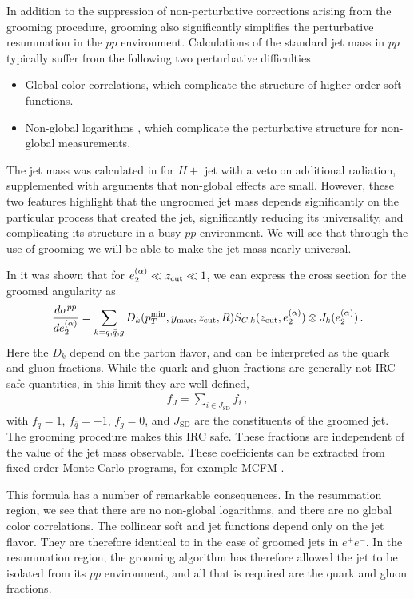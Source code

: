 In addition to the suppression of non-perturbative corrections arising from the grooming procedure, grooming also significantly simplifies the perturbative resummation in the $pp$ environment. Calculations of the standard jet mass in $pp$ typically suffer from the following two perturbative difficulties
\begin{itemize}
\item Global color correlations, which complicate the structure of higher order soft functions.
\item Non-global logarithms \cite{Dasgupta:2001sh}, which complicate the perturbative structure for non-global measurements.
\end{itemize}
The jet mass was calculated in \cite{Jouttenus:2013hs} for $H+$ jet with a veto on additional radiation, supplemented with arguments that non-global effects are small. However, these two features highlight that the ungroomed jet mass depends significantly on the particular process that created the jet, significantly reducing its universality, and complicating its structure in a busy $pp$ environment. We will see that through the use of grooming we will be able to make the jet mass nearly universal.


In  it was shown that for $e_{2}^{(\alpha)} \ll z_{\rm cut} \ll 1$,  we can express the cross section for the groomed angularity as
\begin{align}\label{eq:fac_pp_e2}
\frac{d\sigma^{pp}}{de_{2}^{(\alpha)}}=\sum\limits_{k=q,\bar q, g}D_k(p_T^{\text{min}}, y_\text{max}, z_{\rm cut}, R) S_{C,k}(z_{\rm cut}, e_{2}^{(\alpha)})\otimes J_k (e_{2}^{(\alpha)})\,.
\end{align}
Here the $D_k$ depend on the parton flavor, and can be interpreted as the quark and gluon fractions. While the quark and gluon fractions are generally not IRC safe quantities, in this limit they are well defined, 
\begin{align}
f_J=\sum\limits_{i\in J_{\text{SD}}} f_i\,,
\end{align}
with $f_q=1$, $f_{\bar q}=-1$, $f_g=0$, and $J_{\text{SD}}$ are the constituents of the groomed jet. The grooming procedure makes this IRC safe. These fractions are independent of the value of the jet mass observable. These coefficients can be extracted from fixed order Monte Carlo programs, for example MCFM \cite{Campbell:1999ah,Campbell:2010ff,Campbell:2011bn}.



This formula has a number of remarkable consequences. In the resummation region, we see that there are no non-global logarithms, and there are no global color correlations. The collinear soft and jet functions depend only on the jet flavor. They are therefore identical to in the case of groomed jets in $e^+e^-$. In the resummation region, the grooming algorithm has therefore allowed the jet to be isolated from its $pp$ environment, and all that is required are the quark and gluon fractions. 


